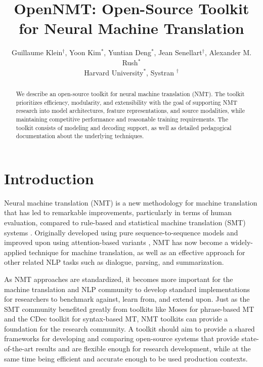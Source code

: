 \documentclass[11pt]{article}
\title{OpenNMT: Open-Source Toolkit for Neural Machine Translation}
\author{Guillaume Klein$^\dagger$, Yoon Kim$^*$, Yuntian Deng$^*$, Jean Senellart$^\dagger$, Alexander M. Rush$^*$ \\ Harvard University$^*$, Systran $^\dagger$}
\date{}
\begin{document}
\maketitle
\begin{abstract}

  We describe an open-source toolkit for neural machine translation
  (NMT).  The toolkit prioritizes efficiency, modularity, and
  extensibility with the goal of supporting NMT research into model
  architectures, feature representations, and source modalities, while
  maintaining competitive performance and reasonable training
  requirements. The toolkit consists of modeling and decoding support,
  as well as detailed pedagogical documentation about the underlying
  techniques.

\end{abstract}

\section{Introduction}


Neural machine translation (NMT) is a new methodology for machine
translation that has led to remarkable improvements, particularly in
terms of human evaluation, compared to rule-based
and statistical machine translation (SMT) systems
\cite{wu2016google,systran}. Originally developed using pure
sequence-to-sequence models \cite{sutskever14sequence,Cho2014} and
improved upon using attention-based variants \cite{Bahdanau2015,Luong2015}, NMT has now become a widely-applied technique for machine
translation, as well as an effective approach for other related NLP
tasks such as dialogue, parsing, and summarization.

As NMT approaches are standardized, it becomes more important for the
machine translation and NLP community to develop standard
implementations for researchers to benchmark against, learn from, and
extend upon. Just as the SMT community benefited greatly from toolkits
like Moses \cite{koehn2007moses} for phrase-based MT and the CDec
toolkit \cite{dyer2010cdec} for syntax-based MT, NMT toolkits can
provide a foundation for the research community. A toolkit should aim
to provide a shared frameworks for developing and comparing
open-source systems that provide state-of-the-art results and are
flexible enough for research development, while at the same time being
efficient and accurate enough to be used production contexts.
\end{document}
